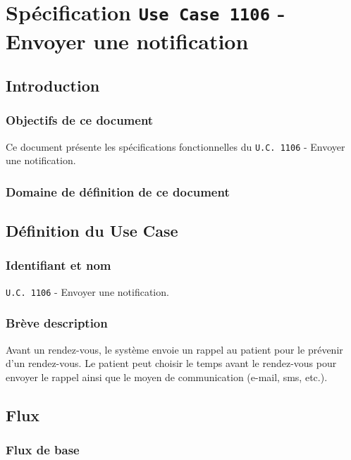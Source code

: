\chapter{Spécification \texttt{Use Case 1106} - Envoyer une notification}

\section{Introduction}

\subsection{Objectifs de ce document}

Ce document présente les spécifications fonctionnelles du \texttt{U.C. 1106} - Envoyer une notification.

\subsection{Domaine de définition de ce document}

\section{Définition du Use Case}

\subsection{Identifiant et nom}

\texttt{U.C. 1106} - Envoyer une notification.

\subsection{Brève description}

Avant un rendez-vous, le système envoie un rappel au patient pour le prévenir d'un rendez-vous.
Le patient peut choisir le temps avant le rendez-vous pour envoyer le rappel ainsi que le moyen
de communication (e-mail, sms, etc.).

\section{Flux}

\subsection{Flux de base}

